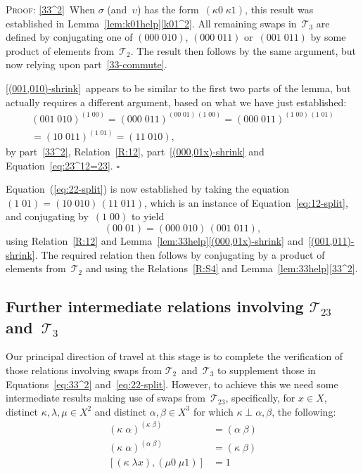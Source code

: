 \documentclass[a4paper,11pt]{article}
\numberwithin{equation}{section}
\newcommand{\eqstate}[1]{Equation~(\ref{#1})}
\newcommand{\swap}[2]{(#1\;#2)}
\newcommand{\Sw}[1]{\mathcal{T}_{#1}}
\newcommand{\qed}{\hspace*{\fill}$\square$}
\newenvironment{proof}{%
  \begin{trivlist}\item\textsc{Proof:}}{\qed\end{trivlist}}
\begin{document}
\begin{proof}
  \ref{33^2}~When $\sigma$ (and~$\upsilon$) has the
  form~$\swap{\kappa0}{\kappa1}$, this result was established in
  Lemma~\ref{lem:k01help}\ref{k01^2}.  All remaining swaps in~$\Sw{3}$
  are defined by conjugating one of $\swap{000}{010}$,
  $\swap{000}{011}$ or~$\swap{001}{011}$ by some product of elements
  from~$\Sw{2}$.  The result then follows by the same argument, but
  now relying upon part~\ref{33-commute}.

  \ref{(001,010)-shrink}~appears to be similar to the first two parts
  of the lemma, but actually requires a different argument, based on
  what we have just established:
  \begin{multline*}
    \swap{001}{010}^{\swap{1}{00}} =
    \swap{000}{011}^{\swap{00}{01} \, \swap{1}{00}} =
    \swap{000}{011}^{\swap{1}{00} \, \swap{1}{01}} \\
    = \swap{10}{011}^{\swap{1}{01}} =
    \swap{11}{010},
  \end{multline*}
  by part~\ref{33^2}, Relation~\ref{R:12}, part~\ref{(000,01x)-shrink}
  and Equation~\eqref{eq:23^12=23}.
\end{proof}

\eqstate{eq:22-split} is now established by taking the equation
$\swap{1}{01} = \swap{10}{010} \, \swap{11}{011}$, which is an
instance of Equation~\eqref{eq:12-split}, and conjugating
by~$\swap{1}{00}$ to yield
\[
\swap{00}{01} = \swap{000}{010} \, \swap{001}{011},
\]
using Relation~\ref{R:12} and
Lemma~\ref{lem:33help}\ref{(000,01x)-shrink}
and~\ref{(001,011)-shrink}.  The required relation then follows by
conjugating by a product of elements from~$\Sw{2}$ and using the
Relations~\ref{R:S4} and Lemma~\ref{lem:33help}\ref{33^2}.

\subsection{\boldmath Further intermediate relations involving
  $\Sw{23}$ and~$\Sw{3}$}

Our principal direction of travel at this stage is to complete the
verification of those relations involving swaps from
$\Sw{2}$~and~$\Sw{3}$ to supplement those in Equations~\eqref{eq:33^2}
and~\eqref{eq:22-split}.  However, to achieve this we need some
intermediate results making use of swaps from~$\Sw{23}$, specifically,
for $x \in X$, distinct $\kappa,\lambda,\mu \in X^{2}$ and distinct
$\alpha,\beta \in X^{3}$ for which $\kappa \perp \alpha,\beta$, the
following:
\begin{align}
  \swap{\kappa}{\alpha}^{\swap{\kappa}{\beta}} &= \swap{\alpha}{\beta}
  \label{eq:23^23=33}
  \\
  \swap{\kappa}{\alpha}^{\swap{\alpha}{\beta}} &= \swap{\kappa}{\beta}
  \label{eq:23^33=23}
  \\
  [ \swap{\kappa}{\lambda x}, \swap{\mu0}{\mu1} ] &= 1
  \label{eq:[23,k01]}
\end{align}
\end{document}
